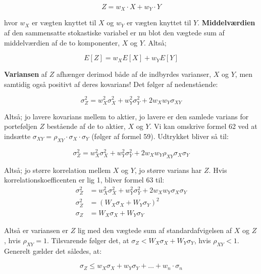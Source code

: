 \documentclass[10pt,reqno, usenames]{article}
\begin{document}
\begin{equation}
    Z = w_X \cdot X + w_Y \cdot Y
\end{equation}

hvor $w_X$ er vægten knyttet til $X$ og $w_Y$ er vægten knyttet til $Y$. \textbf{Middelværdien} af den sammensatte stokastiske variabel er nu blot den vægtede sum af middelværdien af de to komponenter, $X$ og $Y$. Altså; 

\begin{equation}
    E[Z] = w_X E[X] + w_Y E[Y]
\end{equation}

\textbf{Variansen} af $Z$ afhænger derimod både af de indbyrdes varianser, $X$ og $Y$, men samtidig også positivt af deres kovarians! Det følger af nedenstående: 

\begin{equation}
\sigma_Z^2 = w_X^2 \sigma_X^2 + w_Y^2 \sigma_Y^2 + 2 w_X w_Y \sigma_{XY}
\end{equation}

Altså; jo lavere kovarians mellem to aktier, jo lavere er den samlede varians for porteføljen $Z$ bestående af de to aktier, $X$ og $Y$. Vi kan omskrive formel 62 ved at indsætte $\sigma_{XY}= \rho_{XY} \cdot \sigma_X \cdot \sigma_Y$ (følger af formel 59). Udtrykket bliver så til: 

\begin{equation}
\sigma_Z^2 = w_X^2 \sigma_X^2 + w_Y^2 \sigma_Y^2 + 2 w_X w_Y \rho_{XY} \sigma_X \sigma_Y
\end{equation}

Altså; jo større korrelation mellem $X$ og $Y$, jo større varians har $Z$. Hvis korrelationskoefficenten er lig 1, bliver formel 63 til: 
\begin{align*}
    \sigma_Z^2 &= w_X^2 \sigma_X^2 + w_Y^2 \sigma_Y^2 + 2 w_X w_Y \sigma_X \sigma_Y \\
    \sigma_Z^2 &= (W_X \sigma_X + W_Y \sigma_Y)^2 \\
    \sigma_Z &= W_X \sigma_X + W_Y \sigma_Y
\end{align*}

Altså er variansen er $Z$ lig med den vægtede sum af standardafvigelsen af $X$ og $Z$, hvis $\rho_{XY}=1$. Tilsvarende følger det, at $\sigma_Z<W_X \sigma_X + W_Y \sigma_Y$, hvis $\rho_{XY}<1$. Generelt gælder det således, at:

\begin{equation}
    \sigma_Z \leq w_X \sigma_X + w_Y \sigma_Y + \ldots + w_n \cdot \sigma_n
\end{equation}
\end{document}
